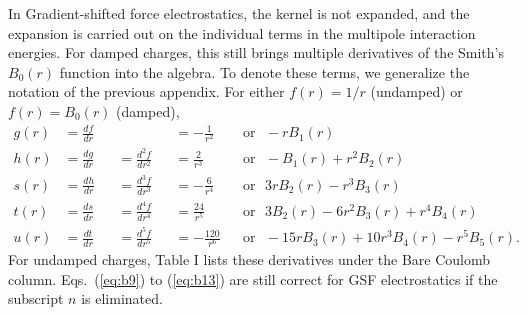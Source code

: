 In Gradient-shifted force electrostatics, the kernel is not expanded,
and the expansion is carried out on the individual terms in the
multipole interaction energies. For damped charges, this still brings
multiple derivatives of the Smith's $B_0(r)$ function into the
algebra. To denote these terms, we generalize the notation of the
previous appendix. For either $f(r)=1/r$ (undamped) or $f(r)=B_0(r)$
(damped),
%
\begin{align}
g(r) &= \frac{df}{d r} &&                      &&=-\frac{1}{r^2}
&&\mathrm{or~~~} -rB_1(r) \\
h(r) &= \frac{dg}{d r} &&= \frac{d^2f}{d r^2} &&= \frac{2}{r^3} &&\mathrm{or~~~}-B_1(r) + r^2 B_2(r) \\
s(r) &= \frac{dh}{d r} &&= \frac{d^3f}{d r^3} &&=-\frac{6}{r^4}&&\mathrm{or~~~}3rB_2(r) - r^3 B_3(r)\\
t(r) &= \frac{ds}{d r} &&= \frac{d^4f}{d r^4} &&= \frac{24}{r^5} &&\mathrm{or~~~} 3
B_2(r) - 6r^2 B_3(r) + r^4 B_4(r) \\
u(r) &= \frac{dt}{d r} &&= \frac{d^5f}{d r^5} &&=-\frac{120}{r^6} &&\mathrm{or~~~} -15
r B_3(r) + 10 r^3B_4(r) -r^5B_5(r).
\end{align}
%
For undamped charges, Table I lists these derivatives under the Bare
Coulomb column. Eqs.~(\ref{eq:b9}) to (\ref{eq:b13}) are still
correct for GSF electrostatics if the subscript $n$ is eliminated.



%
% 
% 